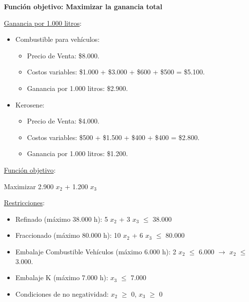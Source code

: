 \documentclass[10pt,a4paper]{article}
\begin{document}
\begin{enumerate}
    \clearpage

    \textbf{Función objetivo: Maximizar la ganancia total}

    \vspace{1em}

    \underline{Ganancia por 1.000 litros}:

    \begin{itemize}

        \item Combustible para vehículos:
        \begin{itemize}

            \item Precio de Venta: \$8.000.
            \item Costos variables: \$1.000 + \$3.000 + \$600 + \$500 = \$5.100.
            \item Ganancia por 1.000 litros: \$2.900. \\
    
        \end{itemize}

        \item Kerosene:
        \begin{itemize}

            \item Precio de Venta: \$4.000.
            \item Costos variables: \$500 + \$1.500 + \$400 + \$400 = \$2.800.
            \item Ganancia por 1.000 litros: \$1.200. \\
    
        \end{itemize}

    \end{itemize}

    \underline{Función objetivo}: 

    \begin{center}
        
        Maximizar 2.900 $x_{2}$ + 1.200 $x_{3}$

    \end{center}

    \underline{Restricciones}: 

    \begin{itemize}

        \item Refinado (máximo 38.000 h):  5 $x_{2}$ + 3 $x_{3}$ $\leq$ 38.000
        \item Fraccionado (máximo 80.000 h): 10 $x_{2}$ + 6 $x_{3}$ $\leq$ 80.000
        \item Embalaje Combustible Vehículos (máximo 6.000 h): 2 $x_{2}$ $\leq$ 6.000 $\rightarrow$ $x_{2}$ $\leq$ 3.000.
        \item Embalaje K (máximo 7.000 h): $x_{3}$ $\leq$ 7.000
        \item Condiciones de no negatividad: $x_{2}$  $\geq$ 0, $x_{3}$ $\geq$ 0\\


\end{itemize}
\end{enumerate}
\end{document}
